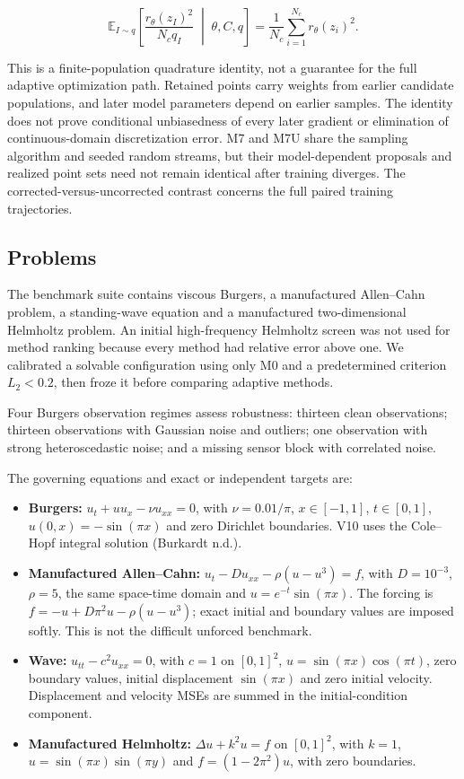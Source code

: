 \documentclass[
  11pt,
]{article}
\providecommand{\tightlist}{%
  \setlength{\itemsep}{0pt}\setlength{\parskip}{0pt}}
\begin{document}
\begin{equation}
\mathbb E_{I\sim q}\left[\frac{r_\theta(z_I)^2}{N_c q_I}\;\middle|\;\theta,C,q\right]
=\frac{1}{N_c}\sum_{i=1}^{N_c}r_\theta(z_i)^2.
\end{equation}

This is a finite-population quadrature identity, not a guarantee for the
full adaptive optimization path. Retained points carry weights from
earlier candidate populations, and later model parameters depend on
earlier samples. The identity does not prove conditional unbiasedness of
every later gradient or elimination of continuous-domain discretization
error. M7 and M7U share the sampling algorithm and seeded random
streams, but their model-dependent proposals and realized point sets
need not remain identical after training diverges. The
corrected-versus-uncorrected contrast concerns the full paired training
trajectories.

\hypertarget{problems}{%
\subsection{Problems}\label{problems}}

The benchmark suite contains viscous Burgers, a manufactured Allen--Cahn
problem, a standing-wave equation and a manufactured two-dimensional
Helmholtz problem. An initial high-frequency Helmholtz screen was not
used for method ranking because every method had relative error above
one. We calibrated a solvable configuration using only M0 and a
predetermined criterion \(L_2<0.2\), then froze it before comparing
adaptive methods.

Four Burgers observation regimes assess robustness: thirteen clean
observations; thirteen observations with Gaussian noise and outliers;
one observation with strong heteroscedastic noise; and a missing sensor
block with correlated noise.

The governing equations and exact or independent targets are:

\begin{itemize}
\tightlist
\item
  \textbf{Burgers:} \(u_t+u u_x-\nu u_{xx}=0\), with \(\nu=0.01/\pi\),
  \(x\in[-1,1]\), \(t\in[0,1]\), \(u(0,x)=-\sin(\pi x)\) and zero
  Dirichlet boundaries. V10 uses the Cole--Hopf integral solution
  (Burkardt n.d.).
\item
  \textbf{Manufactured Allen--Cahn:} \(u_t-Du_{xx}-\rho(u-u^3)=f\), with
  \(D=10^{-3}\), \(\rho=5\), the same space-time domain and
  \(u=e^{-t}\sin(\pi x)\). The forcing is \(f=-u+D\pi^2u-\rho(u-u^3)\);
  exact initial and boundary values are imposed softly. This is not the
  difficult unforced benchmark.
\item
  \textbf{Wave:} \(u_{tt}-c^2u_{xx}=0\), with \(c=1\) on \([0,1]^2\),
  \(u=\sin(\pi x)\cos(\pi t)\), zero boundary values, initial
  displacement \(\sin(\pi x)\) and zero initial velocity. Displacement
  and velocity MSEs are summed in the initial-condition component.
\item
  \textbf{Manufactured Helmholtz:} \(\Delta u+k^2u=f\) on \([0,1]^2\),
  with \(k=1\), \(u=\sin(\pi x)\sin(\pi y)\) and \(f=(1-2\pi^2)u\), with
  zero boundaries.
\end{itemize}
\end{document}
